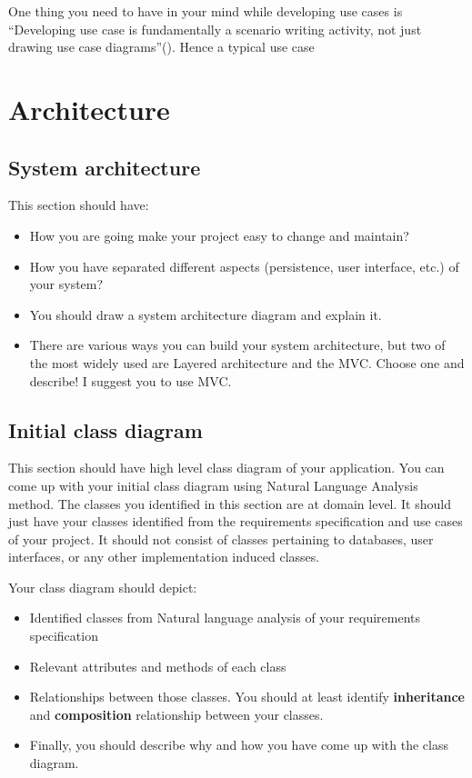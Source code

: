 One thing you need to have in your mind while developing use cases is ``Developing use case is fundamentally a scenario writing activity, not just drawing use case diagrams''(\cite{larman2012applying}). Hence a typical use case 

\section{Architecture} %
\label{sec:architecture}

\subsection{System architecture} %
\label{sub:system_architecture}
This section should have:

\begin{itemize}
	\item How you are going make your project easy to change and maintain?
	\item How you have separated different aspects (persistence, user interface, etc.) of your system?
	\item You should draw a system architecture diagram and explain it. 
	\item There are various ways you can build your system architecture, but two of the most widely used are Layered architecture and the MVC. Choose one and describe! I suggest you to use MVC.
\end{itemize}


\subsection{Initial class diagram} %
\label{sub:initial_class_diagram}

This section should have high level class diagram of your application. You can come up with your initial class diagram using Natural Language Analysis method. The classes you identified in this section are at domain level. It should just have your classes identified from the requirements specification and use cases of your project. It should not consist of classes pertaining to databases, user interfaces, or any other implementation induced classes.

Your class diagram should depict:

\begin{itemize}
	\item Identified classes from Natural language analysis of your requirements specification
	\item Relevant attributes and methods of each class
	\item Relationships between those classes. You should at least identify \textbf{inheritance} and \textbf{composition} relationship between your classes.
	\item Finally, you should describe why and how you have come up with the class diagram.
\end{itemize}

